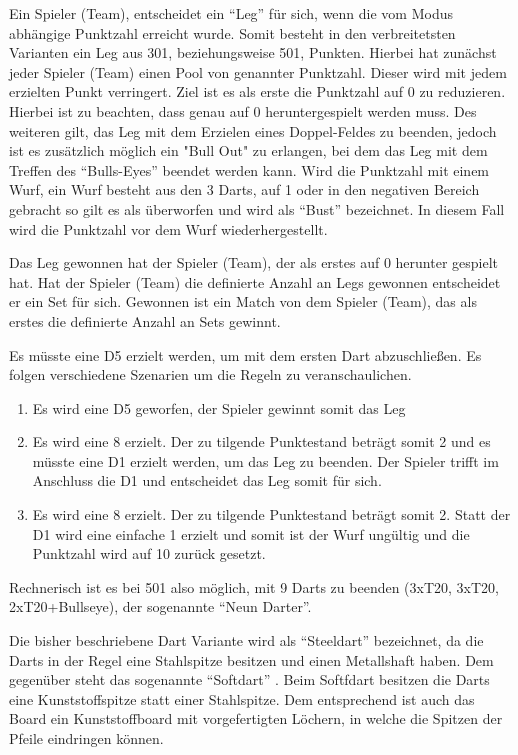 Ein Spieler (Team), entscheidet ein "`Leg"' für sich, wenn die vom Modus abhängige Punktzahl erreicht wurde. Somit besteht in den verbreitetsten Varianten ein Leg aus 301, beziehungsweise 501, Punkten. Hierbei hat zunächst jeder Spieler (Team) einen Pool von genannter Punktzahl. Dieser wird mit jedem erzielten Punkt verringert. Ziel ist es als erste die Punktzahl auf 0 zu reduzieren. Hierbei ist zu beachten, dass genau auf 0 heruntergespielt werden muss. Des weiteren gilt, das Leg mit dem Erzielen eines Doppel-Feldes zu beenden,  jedoch ist es zusätzlich möglich ein "Bull Out" zu erlangen, bei dem das Leg mit dem Treffen des "`Bulls-Eyes"' beendet werden kann. Wird die Punktzahl mit einem Wurf, ein Wurf besteht aus den 3 Darts, auf 1 oder in den negativen Bereich gebracht so gilt es als überworfen und wird als "`Bust"' bezeichnet. In diesem Fall wird die Punktzahl vor dem Wurf wiederhergestellt. \autocite[5]{DartsRegel2016} 

Das Leg gewonnen hat der Spieler (Team), der als erstes auf 0 herunter gespielt hat. Hat der Spieler (Team) die definierte Anzahl an Legs gewonnen entscheidet er ein Set für sich. Gewonnen ist ein Match von dem Spieler (Team), das als erstes die definierte Anzahl an Sets gewinnt.

\begin{example} 

Es müsste eine D5 erzielt werden, um mit dem ersten Dart abzuschließen. Es folgen verschiedene Szenarien um die Regeln zu veranschaulichen.
\begin{enumerate}
	\item Es wird eine D5 geworfen, der Spieler gewinnt somit das Leg
	\item Es wird eine 8 erzielt. Der zu tilgende Punktestand beträgt somit 2 und es müsste eine D1 erzielt werden, um das Leg zu beenden. Der Spieler trifft im Anschluss die D1 und entscheidet das Leg somit für sich. 
	\item Es wird eine 8 erzielt. Der zu tilgende Punktestand beträgt somit 2. Statt der D1 wird eine einfache 1 erzielt und somit ist der Wurf ungültig und die Punktzahl wird auf 10 zurück gesetzt.
\end{enumerate}
\end{example}

Rechnerisch ist es bei 501 also möglich, mit 9 Darts zu beenden (3xT20, 3xT20, 2xT20+Bullseye), der sogenannte "`Neun Darter"'.

Die bisher beschriebene Dart Variante wird als "`Steeldart"' bezeichnet, da die Darts in der Regel eine Stahlspitze besitzen und einen Metallshaft haben. Dem gegenüber steht das sogenannte "`Softdart"' . Beim Softfdart besitzen die Darts eine Kunststoffspitze statt einer Stahlspitze. Dem entsprechend ist auch das Board ein Kunststoffboard mit vorgefertigten Löchern, in welche die Spitzen der Pfeile eindringen können. 


